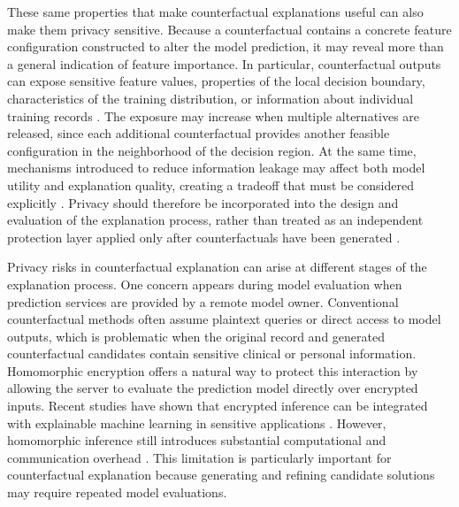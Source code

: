 \documentclass[preprint,12pt]{elsarticle}
\begin{document}
These same properties that make counterfactual explanations useful can also
make them privacy sensitive. Because a counterfactual contains a concrete feature configuration constructed to alter the model prediction, it may reveal more than a general indication of feature importance. In particular, counterfactual outputs can expose sensitive feature values, properties of the local decision boundary, characteristics of the training distribution, or information about individual training records
\cite{nguyen2025privacy,goethals2023privacy,babaei2026privacycf}. The exposure may increase when
multiple alternatives are released, since each additional counterfactual provides another feasible configuration in the neighborhood of the decision region. At the same time, mechanisms introduced to reduce information leakage may affect both model utility and explanation quality, creating a tradeoff that must be considered explicitly \cite{allana2026petxai}. Privacy should therefore be incorporated into the design and evaluation of the explanation process,
rather than treated as an independent protection layer applied only after
counterfactuals have been generated \cite{nguyen2025privacy}.

Privacy risks in counterfactual explanation can arise at different stages of the explanation process. One concern appears during model evaluation when prediction services are provided by a remote model owner. Conventional counterfactual methods often assume plaintext queries or direct access to model outputs, which is problematic when the original record and generated counterfactual candidates contain sensitive clinical or personal information. Homomorphic encryption offers a natural way to protect this interaction by allowing the server to evaluate the prediction model directly over encrypted inputs. Recent studies have shown that encrypted inference can be integrated with explainable machine learning in sensitive applications \cite{cenitta2025ecghe}. However, homomorphic inference still introduces substantial computational and
communication overhead \cite{magni2025fhe}. This limitation is particularly important for counterfactual explanation because generating and refining
candidate solutions may require repeated model evaluations.
\end{document}
